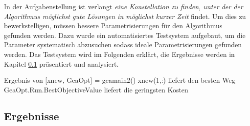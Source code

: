 In der Aufgabenstellung \cite{aufg} ist verlangt \emph{eine Konstellation zu finden,
unter der der Algorithmus möglichst gute Lösungen in möglichst kurzer Zeit} findet.
Um dies zu bewerkstelligen, müssen bessere Parametrisierungen für den Algorithmus
gefunden werden. Dazu wurde ein automatisiertes Testsystem aufgebaut, um
die Parameter systematisch abzusuchen sodass ideale Parametrisierungen
gefunden werden. Das Testsystem wird im Folgenden erklärt, die Ergebnisse
werden in Kapitel \ref{ergebnisse} präsentiert und analysiert.

Ergebnis von [xnew, GeaOpt] = geamain2()
xnew(1,:) liefert den besten Weg
GeaOpt.Run.BestObjectiveValue liefert die geringsten Kosten

\subsection{Ergebnisse}\label{ergebnisse}



